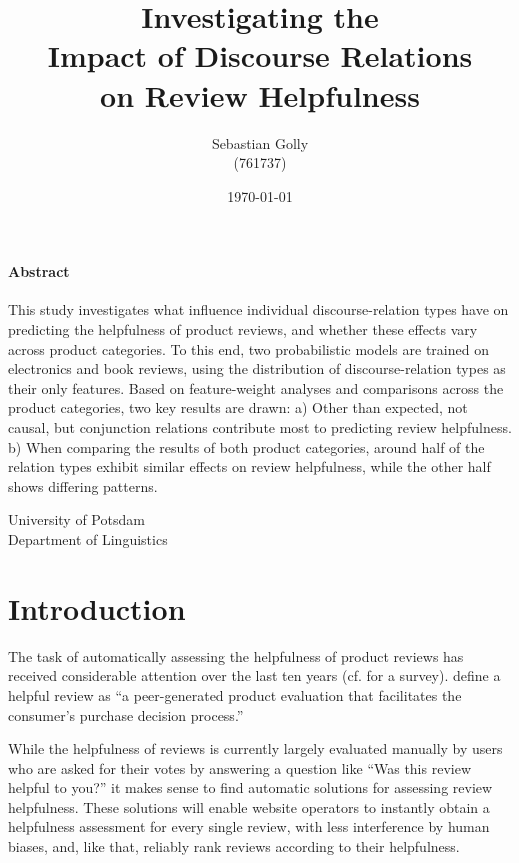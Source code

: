 \documentclass[
    a4paper,%
    12pt,%
    oneside,%
    toc=bibliography,
    final,
]{scrartcl}
\title{Investigating the \\Impact of Discourse Relations\\ on Review Helpfulness}
\subtitle{}
\author{Sebastian Golly\\ {\normalsize (761737)}}
\date{\today}
\begin{document}
\maketitle

\vfill

\paragraph{Abstract}
This study investigates what influence individual discourse-relation types have on predicting the helpfulness of product reviews, and whether these effects vary across product categories. To this end, two probabilistic models are trained on electronics and book reviews, using the distribution of discourse-relation types as their only features. Based on feature-weight analyses and comparisons across the product categories, two key results are drawn: a) Other than expected, not causal, but conjunction relations contribute most to predicting review helpfulness. b) When comparing the results of both product categories, around half of the relation types exhibit similar effects on review helpfulness, while the other half shows differing patterns.
\\[3em]

\vfill

\begin{center}
University of Potsdam\\[1.5em]
Department of Linguistics
\end{center}

\thispagestyle{empty}
\newpage


\section{Introduction}

The task of automatically assessing the helpfulness of product reviews has received considerable attention over the last ten years (cf. \citealt{Almagrabi2015} for a survey). \citet[186]{MudambiSchuff2010} define a helpful review as “a peer-generated product evaluation that facilitates the consumer’s purchase decision process.”

While the helpfulness of reviews is currently largely evaluated manually by users who are asked for their votes by answering a question like “Was this review helpful to you?” it makes sense to find automatic solutions for assessing review helpfulness. These solutions will enable website operators to instantly obtain a helpfulness assessment for every single review, with less interference by human biases, and, like that, reliably rank reviews according to their helpfulness.
\end{document}
